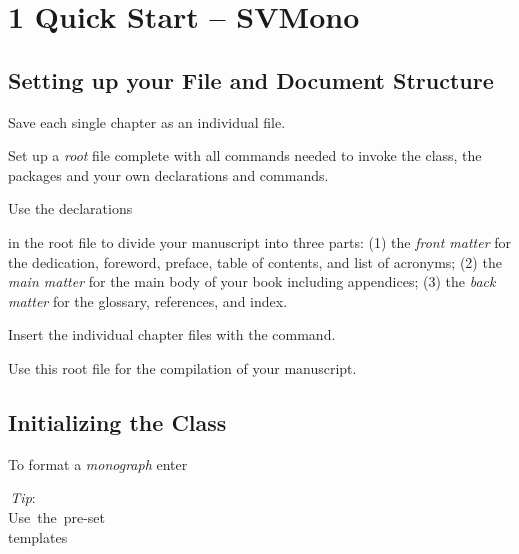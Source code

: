 \documentclass[graybox]{svmono}
\def\thechapter{\vspace*{-2pc}}
\begin{document}
\chapter{1 Quick Start -- SVMono}



\begin{sloppy}



\vspace*{-12pc}

\def\thechapter{\arabic{chapter}}
\section{Setting up your File and Document Structure}

Save each single chapter as an individual file.

Set up a {\it root} file complete with all commands needed to invoke the class, the
packages and your own declarations and commands.

Use the declarations
\cprotect{}


in the root file to divide your manuscript into three parts: (1) the {\it front matter}
for the dedication, foreword, preface, table of contents, and list of acronyms; (2)
the {\it main matter} for the main body of your book including appendices; (3) the
{\it back matter} for the glossary, references, and index.

Insert the individual chapter files with the \verb|| command.

Use this root file for the compilation of your manuscript.

\section{Initializing the Class}

To format a {\it monograph} enter

\cprotect{}

\vspace*{-5pc}
\hspace*{28pc}\,{\it Tip}: \\
\hspace*{28pc} \hbox{Use the pre-set}\\
\hspace*{28pc} \hbox{templates}\\


\end{sloppy}
\end{document}

